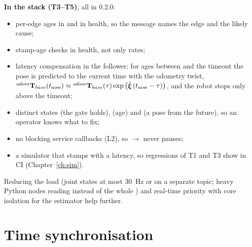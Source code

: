 \textbf{In the stack (T3--T5)}, all in 0.2.0:
\begin{itemize}
  \item per-edge ages in  and in health, so the message names the edge and the likely
    cause;
  \item stamp-age checks in health, not only rates;
  \item latency compensation in the follower: for ages between 
    and the timeout the pose is predicted to the current time with the odometry twist,
    ${}^{odom}\mathbf{T}_{base}(t_{\mathrm{now}}) \approx {}^{odom}\mathbf{T}_{base}(\tau)\exp\big(\hat{\boldsymbol{\xi}}\,
    (t_{\mathrm{now}} - \tau)\big)$, and the robot stops only above the timeout;
  \item distinct states  (the gate holds),  (age) and
     (a pose from the future), so an operator knows what to fix;
  \item no blocking service callbacks (L2), so $\to$ never pauses;
  \item a simulator that stamps with a latency, so regressions of T1 and T3 show in CI
    (Chapter~\ref{ch:sim}).
\end{itemize}
Reducing the  load (joint states at most 30~Hz or on a separate topic; heavy Python
nodes reading  instead of the whole ) and real-time priority
with core isolation for the estimator help further.

\section{Time synchronisation}
\label{sec:timesync}

